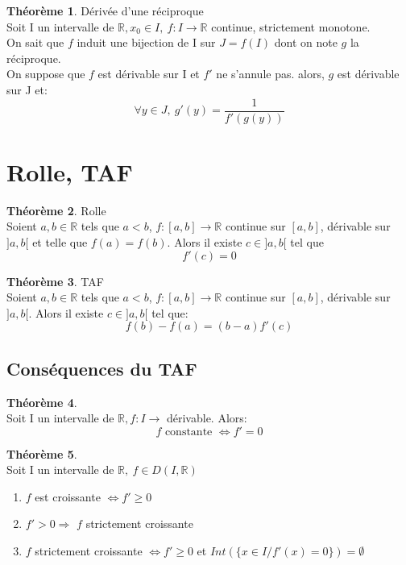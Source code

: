 \documentclass[fleqn]{article}
\theoremstyle{definition} \newtheorem*{defi}{D\'efinition}
\theoremstyle{definition} \newtheorem*{theo}{Th\'eor\`eme}
\theoremstyle{remark} \newtheorem*{rqs}{Remarques}
\theoremstyle{definition} \newtheorem*{prop}{Propri\'et\'e}
\begin{document}
\begin{theo} D\'eriv\'ee d'une r\'eciproque\\
	Soit I un intervalle de $\mathbb{R}, x_0 \in I,\ f:I\rightarrow \mathbb{R}$ continue, strictement monotone. \\
	On sait que $f$ induit une bijection de I sur $J=f(I)$ dont on note $g$ la r\'eciproque. \\
	On suppose que $f$ est d\'erivable sur I et $f'$ ne s'annule pas. alors, $g$ est d\'erivable sur J et:
	\[\forall y \in J,\ g'(y) = \frac{1}{f'(g(y))}\]
\end{theo}

\section{Rolle, TAF}
\begin{theo} Rolle\\
	Soient $a, b \in \mathbb{R}$ tels que $a < b$, $f:[a,b] \rightarrow \mathbb{R}$ continue sur $[a,b]$, d\'erivable sur $]a,b[$ et telle que $f(a) = f(b)$. Alors il existe $c \in ]a,b[$
	tel que \[f'(c) = 0\]
\end{theo}

\begin{theo} TAF\\
	Soient $a, b \in \mathbb{R}$ tels que $a < b$,  $f:[a,b] \rightarrow \mathbb{R}$ continue sur $[a,b]$, d\'erivable sur $]a,b[$.
	Alors il existe $c \in ]a,b[$ tel que:
	\[f(b) - f(a) = (b-a)f'(c)\]
\end{theo}

\subsection{Cons\'equences du TAF}
\begin{theo} $ $\\
	Soit I un intervalle de $\mathbb{R}, f:I \rightarrow$ d\'erivable. Alors:
	\[f\text{ constante }\Leftrightarrow f' = 0\]
\end{theo}

\begin{theo} $ $ \\
	Soit I un intervalle de $\mathbb{R},\ f \in D(I, \mathbb{R})$
	\begin{enumerate}
		\item $f$ est croissante $\Leftrightarrow f' \geq 0$
		\item $f' > 0 \Rightarrow $ $f$ strictement croissante
		\item $f$ strictement croissante $\Leftrightarrow f' \geq 0$ et $Int(\{x\in I /f'(x) = 0\}) = \emptyset$
	\end{enumerate}
\end{theo}
\end{document}
